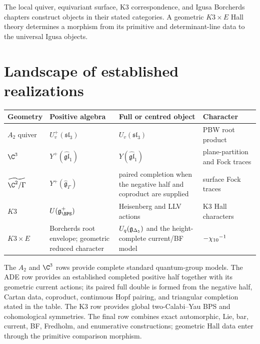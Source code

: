 The local quiver, equivariant surface, K3 correspondence, and Igusa Borcherds chapters construct objects in their stated categories.  A geometric $K3\times E$ Hall theory determines a morphism from its primitive and determinant-line data to the universal Igusa objects.

\chapter{Landscape of established realizations}
\begin{center}
\footnotesize
\begin{tabularx}{0.99\textwidth}{@{}>{\raggedright\arraybackslash}p{}>{\raggedright\arraybackslash}p{}>{\raggedright\arraybackslash}X>{\raggedright\arraybackslash}p{}@{}}
\toprule
\textbf{Geometry}&\textbf{Positive algebra}&\textbf{Full or centred object}&\textbf{Character}\\
\midrule
$A_2$ quiver&$U_v^+(\mathfrak{sl}_3)$&$U_v(\mathfrak{sl}_3)$&PBW root product\\
$\C^3$&$Y^+(\widehat{\mathfrak{gl}}_1)$&$Y(\widehat{\mathfrak{gl}}_1)$&plane-partition and Fock traces\\
$\widetilde{\C^2/\Gamma}$&$Y^+(\widehat{\mathfrak g}_\Gamma)$&paired completion when the negative half and coproduct are supplied&surface Fock traces\\
$K3$&$U(\mathfrak g_{\BPS}^+)$&Heisenberg and LLV actions&K3 Hall characters\\
$K3\times E$&Borcherds root envelope; geometric reduced character&$U_q({\mathfrak g_{\Delta_5}})$ and the height-complete current/BF model&$-{\chi_{10}}^{-1}$\\
\bottomrule
\end{tabularx}
\end{center}
The $A_2$ and $\C^3$ rows provide complete standard quantum-group models. The ADE row provides an established completed positive half together with its geometric current actions; its paired full double is formed from the negative half, Cartan data, coproduct, continuous Hopf pairing, and triangular completion stated in the table. The K3 row provides global two-Calabi--Yau BPS and cohomological symmetries. The final row combines exact automorphic, Lie, bar, current, BF, Fredholm, and enumerative constructions; geometric Hall data enter through the primitive comparison morphism.

